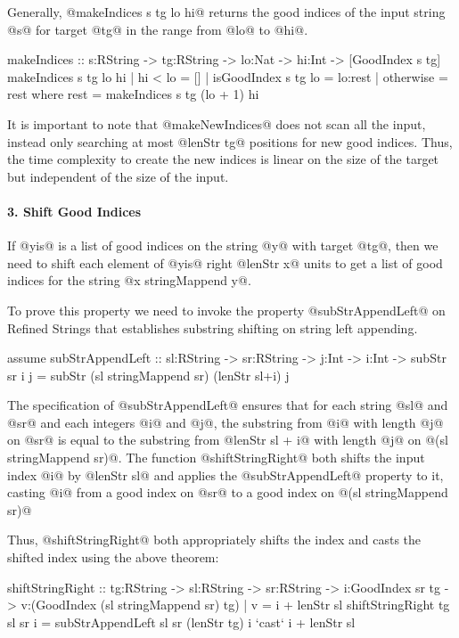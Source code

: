 Generally, @makeIndices s tg lo hi@ returns the good indices
of the input string @s@ for target @tg@ in the range from @lo@ to @hi@.
%
\begin{code}
makeIndices
  :: s:RString -> tg:RString -> lo:Nat
  -> hi:Int -> [GoodIndex s tg]
makeIndices s tg lo hi
  | hi < lo             = []
  | isGoodIndex s tg lo = lo:rest
  | otherwise           = rest
  where
    rest = makeIndices s tg (lo + 1) hi
\end{code}

It is important to note that
@makeNewIndices@ does not scan all the input,
instead only searching at most @lenStr tg@ positions for new good indices.
%
Thus, the time complexity to create the new indices is linear
on the size of the target but independent of the size of the input.

\paragraph{3. Shift Good Indices}
If @yis@ is a list of good indices on the string @y@ with target @tg@,
then we need to shift each element of @yis@ right @lenStr x@ units to
get a list of good indices for the string @x stringMappend y@.

%
To prove this property we need to invoke the property
@subStrAppendLeft@ on Refined Strings that establishes
substring shifting on string left appending.
%
\begin{code}
assume subStrAppendLeft
  :: sl:RString -> sr:RString
  -> j:Int -> i:Int
  -> {subStr sr i j = subStr (sl stringMappend sr) (lenStr sl+i) j}
\end{code}
%
The specification of @subStrAppendLeft@ ensures that for each
string @sl@ and @sr@ and each integers @i@ and @j@,
the substring from @i@ with length @j@ on @sr@
is equal to the substring from @lenStr sl + i@
with length @j@ on @(sl stringMappend sr)@.
%
The function @shiftStringRight@ both shifts the input index @i@ by @lenStr sl@
and applies the @subStrAppendLeft@ property to it,
casting @i@ from a good index on @sr@ to a good index on @(sl stringMappend sr)@

Thus, @shiftStringRight@ both appropriately shifts the index
and casts the shifted index using the above theorem:
\begin{code}
shiftStringRight
  :: tg:RString -> sl:RString -> sr:RString
  -> i:GoodIndex sr tg
  -> {v:(GoodIndex (sl stringMappend sr) tg) | v = i + lenStr sl}
shiftStringRight tg sl sr i
  = subStrAppendLeft sl sr (lenStr tg) i
    `cast` i + lenStr sl
\end{code}


